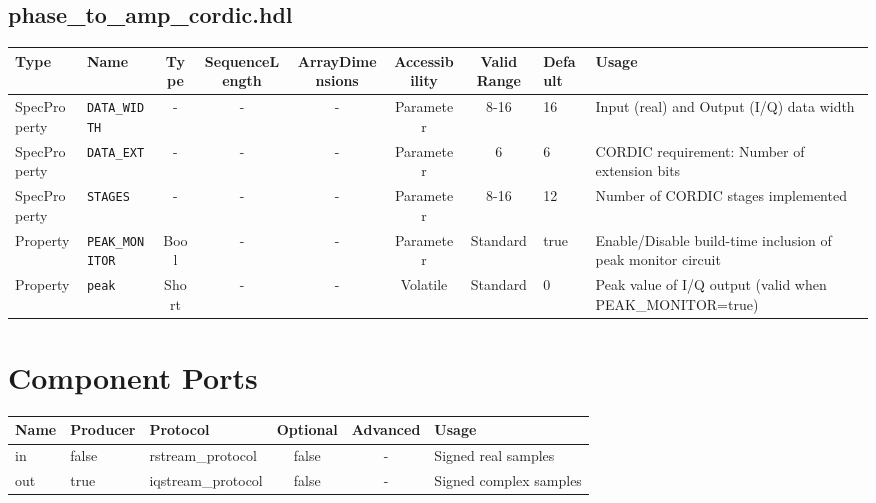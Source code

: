 \documentclass{article}
\def\comp{phase\_to\_amp\_cordic}
\begin{document}
\begin{landscape}
\subsection*{\comp.hdl}
\begin{scriptsize}
	\begin{tabular}{|p{3cm}|p{2cm}|c|c|c|c|c|p{1cm}|p{6cm}|}
		\hline
		\rowcolor{blue}
		Type         & Name              & Type & SequenceLength & ArrayDimensions & Accessibility & Valid Range & Default & Usage                                    \\
		\hline
		SpecProperty & \verb+DATA_WIDTH+ & -    & -              & -               & Parameter     & 8-16        & 16      & Input (real) and Output (I/Q) data width \\
		\hline
		SpecProperty & \verb+DATA_EXT+   & -    & -              & -               & Parameter     & 6           & 6       & CORDIC requirement: Number of extension bits \\
		\hline
		SpecProperty & \verb+STAGES+     & -    & -              & -               & Parameter     & 8-16        & 12      & Number of CORDIC stages implemented      \\
		\hline
		Property & \verb+PEAK_MONITOR+     & Bool    & -              & -               & Parameter     & Standard        & true      & Enable/Disable build-time inclusion of peak monitor circuit\\
		\hline
		Property & \verb+peak+     & Short & -              & -               & Volatile & Standard        & 0 & Peak value of I/Q output (valid when PEAK\_MONITOR=true)\\
		\hline
	\end{tabular}
\end{scriptsize}

\section*{Component Ports}
\begin{scriptsize}
	\begin{tabular}{|M{2cm}|M{1.5cm}|M{4cm}|c|c|M{9cm}|}
		\hline
		Name & Producer & Protocol           & Optional & Advanced & Usage                  \\
		\hline
		in   & false    & rstream\_protocol  & false    & -        & Signed real samples    \\
		\hline
		out  & true     & iqstream\_protocol & false    & -        & Signed complex samples \\
		\hline
	\end{tabular}
\end{scriptsize}


\end{landscape}
\end{document}
